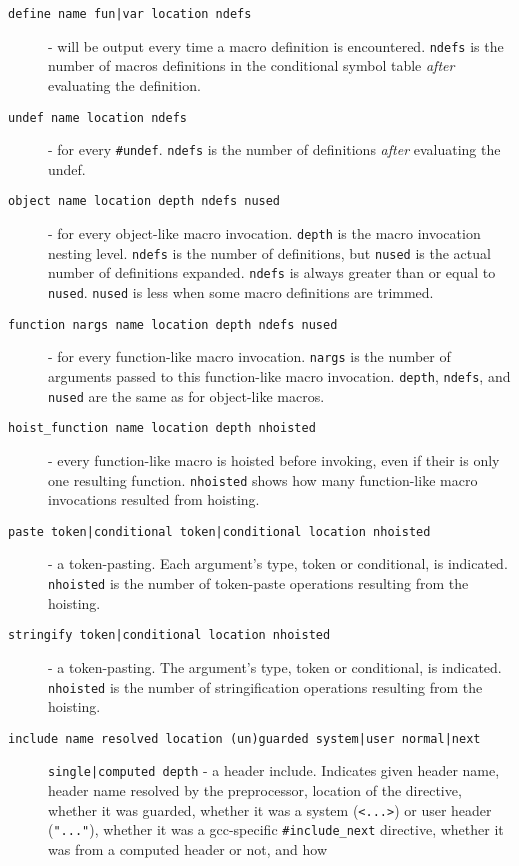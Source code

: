 \documentclass{article}
\begin{document}
\begin{description}
\item[\texttt{define name fun|var location ndefs}] - will be output every
  time a macro definition is encountered.  \verb"ndefs" is the number of
  macros definitions in the conditional symbol table \emph{after}
  evaluating the definition.
\item[\texttt{undef name location ndefs}] - for every \verb"#undef". \verb"ndefs" is the
  number of definitions \emph{after} evaluating the undef.
\item[\texttt{object name location depth ndefs nused}] - for every
  object-like macro invocation.  \verb"depth" is the macro invocation
  nesting level.  \verb"ndefs" is the number of definitions, but \verb"nused" is
  the actual number of definitions expanded.  \verb"ndefs" is always
  greater than or equal to \verb"nused".  \verb"nused" is less when some macro
  definitions are trimmed.
\item[\texttt{function nargs name location depth ndefs nused}] - for every
  function-like macro invocation.  \verb"nargs" is the number of arguments
  passed to this function-like macro invocation.  \verb"depth", \verb"ndefs",
  and \verb"nused" are the same as for object-like macros.
\item[\texttt{hoist\_function name location depth nhoisted}] - every function-like
  macro is hoisted before invoking, even if their is only one
  resulting function.  \verb"nhoisted" shows how many function-like macro
  invocations resulted from hoisting.
\item[\texttt{paste token|conditional token|conditional location nhoisted}] -
  a token-pasting.  Each argument's type, token or conditional, is
  indicated.  \verb"nhoisted" is the number of token-paste operations
  resulting from the hoisting.
\item[\texttt{stringify token|conditional location nhoisted}] - a
  token-pasting.  The argument's type, token or conditional, is
  indicated.  \verb"nhoisted" is the number of stringification operations
  resulting from the hoisting.
\item[\texttt{include name resolved location (un)guarded system|user
    normal|next}] \texttt{single|computed depth} - a header include.
  Indicates given header name, header name resolved by the
  preprocessor, location of the directive, whether it was guarded,
  whether it was a system (\verb"<...>") or user header
  (\verb'"..."'), whether it was a gcc-specific \verb"#include_next"
  directive, whether it was from a computed header or not, and how

\end{description}
\end{document}
